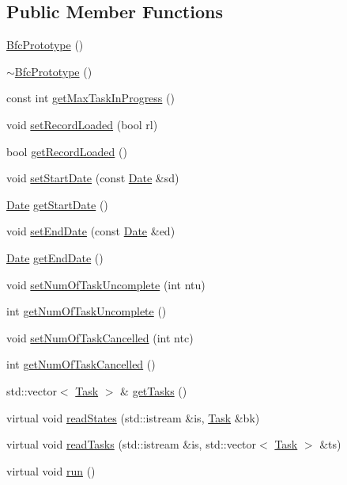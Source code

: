 \subsection*{Public Member Functions}
\begin{DoxyCompactItemize}
\item 
\hyperlink{classBfcPrototype_a1d7d4392c17131eec1bc4219c2570433}{Bfc\-Prototype} ()
\item 
\hyperlink{classBfcPrototype_a004df1fc2cc7e03a4263edbe58c8f9fd}{$\sim$\-Bfc\-Prototype} ()
\item 
const int \hyperlink{classBfcPrototype_a1406e452c20ef38bca9067fefee33131}{get\-Max\-Task\-In\-Progress} ()
\item 
void \hyperlink{classBfcPrototype_ac38bd69cfe25044d2d866f2418795095}{set\-Record\-Loaded} (bool rl)
\item 
bool \hyperlink{classBfcPrototype_ad043f4e365502a6aec354d4f628c1404}{get\-Record\-Loaded} ()
\item 
void \hyperlink{classBfcPrototype_abb4cd3d18d2646878e00f910a89def2d}{set\-Start\-Date} (const \hyperlink{classDate}{Date} \&sd)
\item 
\hyperlink{classDate}{Date} \hyperlink{classBfcPrototype_affedd6397fcaef70f5fa397abbbf2901}{get\-Start\-Date} ()
\item 
void \hyperlink{classBfcPrototype_ab0c5d38d1e9cf0fe02e3fb5da830a802}{set\-End\-Date} (const \hyperlink{classDate}{Date} \&ed)
\item 
\hyperlink{classDate}{Date} \hyperlink{classBfcPrototype_ace745963c4c4fca8cae7c26240acf896}{get\-End\-Date} ()
\item 
void \hyperlink{classBfcPrototype_a063443b1a0a90b795c156381b41e915d}{set\-Num\-Of\-Task\-Uncomplete} (int ntu)
\item 
int \hyperlink{classBfcPrototype_af9a1299268eefad25f59b7bdb7dba5d7}{get\-Num\-Of\-Task\-Uncomplete} ()
\item 
void \hyperlink{classBfcPrototype_a3ac9f7f398cfdf3cc499f955f263672f}{set\-Num\-Of\-Task\-Cancelled} (int ntc)
\item 
int \hyperlink{classBfcPrototype_ae24a6187235106026e978fcbe49c1944}{get\-Num\-Of\-Task\-Cancelled} ()
\item 
std\-::vector$<$ \hyperlink{classTask}{Task} $>$ \& \hyperlink{classBfcPrototype_a414637b5643f0ef2a8834d1d591da364}{get\-Tasks} ()
\item 
virtual void \hyperlink{classBfcPrototype_a5dc018641f00dd03d166a6df7dcfbc4a}{read\-States} (std\-::istream \&is, \hyperlink{classTask}{Task} \&bk)
\item 
virtual void \hyperlink{classBfcPrototype_a664d219b93aa7ecf98b2686c72f918f6}{read\-Tasks} (std\-::istream \&is, std\-::vector$<$ \hyperlink{classTask}{Task} $>$ \&ts)
\item 
virtual void \hyperlink{classBfcPrototype_aa678371c41f50fe28619a589f41bb6dc}{run} ()
\end{DoxyCompactItemize}
